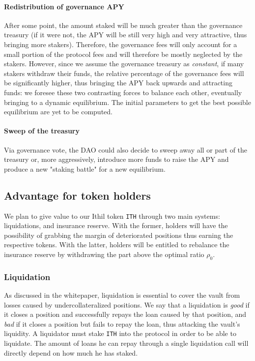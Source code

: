 \documentclass[a4paper,10 pt]{article}
\theoremstyle{definition}
\begin{document}
\paragraph{Redistribution of governance APY}
After some point, the amount staked will be much greater than the governance treasury (if it were not, the APY will be still very high and very attractive, thus bringing more stakers). Therefore, the governance fees will only account for a small portion of the protocol fees and will therefore be mostly neglected by the stakers. However, since we assume the governance treasury as {\it constant}, if many stakers withdraw their funds, the relative percentage of the governance fees will be significantly higher, thus bringing the APY back upwards and attracting funds: we foresee these two contrasting forces to balance each other, eventually bringing to a dynamic equilibrium. The initial parameters to get the best possible equilibrium are yet to be computed.

\paragraph{Sweep of the treasury}
Via governance vote, the DAO could also decide to sweep away all or part of the treasury or, more aggressively, introduce more funds to raise the APY and produce a new "staking battle" for a new equilibrium.

\subsection{Advantage for token holders}

We plan to give value to our Ithil token \verb|ITH| through two main systems: liquidations, and insurance reserve. With the former, holders will have the possibility of grabbing the margin of deteriorated positions thus earning the respective tokens. With the latter, holders will be entitled to rebalance the insurance reserve by withdrawing the part above the optimal ratio $\rho_0$.

\subsubsection{Liquidation}

As discussed in the whitepaper, liquidation is essential to cover the vault from losses caused by undercollateralized positions. We say that a liquidation is {\it good} if it closes a position and successfully repays the loan caused by that position, and {\it bad} if it closes a position but fails to repay the loan, thus attacking the vault's liquidity. A liquidator must stake \verb|ITH| into the protocol in order to be able to liquidate. The amount of loans he can repay through a single liquidation call will directly depend on how much he has staked.
\end{document}
